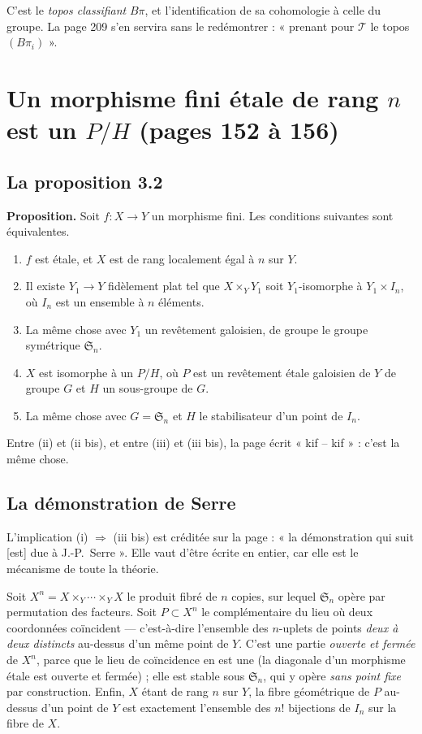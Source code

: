 \documentclass[11pt,a4paper]{article}
\begin{document}
C'est le \emph{topos classifiant} $B\pi$, et l'identification de sa cohomologie
à celle du groupe. La page 209 s'en servira sans le redémontrer : « prenant
pour $\mathcal{T}$ le topos $(B\pi_{i})$ ».

\section*{Un morphisme fini étale de rang $n$ est un $P/H$ (pages 152 à 156)}

\subsection*{La proposition 3.2}

\textbf{Proposition.} Soit $f : X \to Y$ un morphisme fini. Les conditions
suivantes sont équivalentes.

\begin{enumerate}
  \item[(i)] $f$ est étale, et $X$ est de rang localement égal à $n$ sur $Y$.
  \item[(ii)] Il existe $Y_{1} \to Y$ fidèlement plat tel que
    $X \times_{Y} Y_{1}$ soit $Y_{1}$-isomorphe à $Y_{1} \times I_{n}$, où
    $I_{n}$ est un ensemble à $n$ éléments.
  \item[(ii bis)] La même chose avec $Y_{1}$ un revêtement galoisien, de groupe
    le groupe symétrique $\mathfrak{S}_{n}$.
  \item[(iii)] $X$ est isomorphe à un $P/H$, où $P$ est un revêtement étale
    galoisien de $Y$ de groupe $G$ et $H$ un sous-groupe de $G$.
  \item[(iii bis)] La même chose avec $G = \mathfrak{S}_{n}$ et $H$ le
    stabilisateur d'un point de $I_{n}$.
\end{enumerate}

Entre (ii) et (ii bis), et entre (iii) et (iii bis), la page écrit
« kif -- kif » : c'est la même chose.

\subsection*{La démonstration de Serre}

L'implication (i) $\Rightarrow$ (iii bis) est créditée sur la page : « la
démonstration qui suit [est] due à J.-P.\ Serre ». Elle vaut d'être écrite en
entier, car elle est le mécanisme de toute la théorie.

Soit $X^{n} = X \times_{Y} \cdots \times_{Y} X$ le produit fibré de $n$
copies, sur lequel $\mathfrak{S}_{n}$ opère par permutation des facteurs. Soit
$P \subset X^{n}$ le complémentaire du lieu où deux coordonnées coïncident ---
c'est-à-dire l'ensemble des $n$-uplets de points \emph{deux à deux distincts}
au-dessus d'un même point de $Y$. C'est une partie \emph{ouverte et fermée} de
$X^{n}$, parce que le lieu de coïncidence en est une (la diagonale d'un
morphisme étale est ouverte et fermée) ; elle est stable sous
$\mathfrak{S}_{n}$, qui y opère \emph{sans point fixe} par construction. Enfin,
$X$ étant de rang $n$ sur $Y$, la fibre géométrique de $P$ au-dessus d'un point
de $Y$ est exactement l'ensemble des $n!$ bijections de $I_{n}$ sur la fibre de
$X$.
\end{document}
